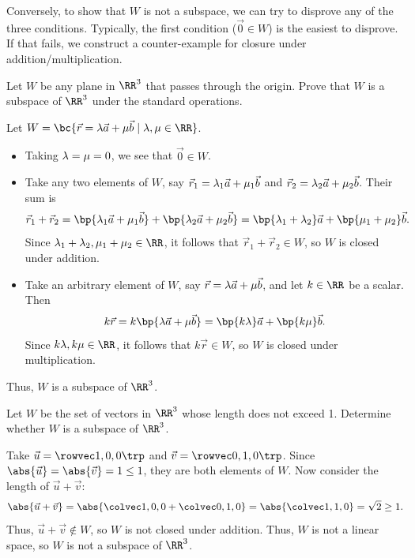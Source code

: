 Conversely, to show that $W$ is not a subspace, we can try to disprove any of the three conditions. Typically, the first condition ($\vec 0 \in W$) is the easiest to disprove. If that fails, we construct a counter-example for closure under addition/multiplication.

\begin{sample}\label{sample:linear-transformations:planes}
    Let $W$ be any plane in $\RR^3$ that passes through the origin. Prove that $W$ is a subspace of $\RR^3$ under the standard operations.
\end{sample}
\begin{sampans}
    Let $W = \bc{\vec r = \l \vec a + \m \vec b \mid \l, \m \in \RR}$.
    \begin{itemize}
        \item Taking $\lambda = \mu = 0$, we see that $\vec 0 \in W$.
        \item Take any two elements of $W$, say $\vec r_1 = \lambda_1 \vec a + \mu_1 \vec b$ and $\vec r_2 = \lambda_2 \vec a + \mu_2 \vec b$. Their sum is \[\vec r_1 + \vec r_2 = \bp{\l_1 \vec a + \m_1 \vec b} + \bp{\l_2 \vec a + \m_2 \vec b} = \bp{\l_1 + \l_2} \vec a + \bp{\m_1 + \m_2} \vec b.\] Since $\l_1 + \l_2, \m_1 + \m_2 \in \RR$, it follows that $\vec r_1 + \vec r_2 \in W$, so $W$ is closed under addition.
        \item Take an arbitrary element of $W$, say $\vec r = \lambda \vec a + \mu \vec b$, and let $k \in \RR$ be a scalar. Then \[k\vec r = k\bp{\l \vec a + \m \vec b} = \bp{k \l} \vec a + \bp{k \m} \vec b.\] Since $k\l, k\m \in \RR$, it follows that $k \vec r \in W$, so $W$ is closed under multiplication.
    \end{itemize}
    Thus, $W$ is a subspace of $\RR^3$.
\end{sampans}

\begin{sample}
    Let $W$ be the set of vectors in $\RR^3$ whose length does not exceed 1. Determine whether $W$ is a subspace of $\RR^3$.
\end{sample}
\begin{sampans}
    Take $\vec u = \cveciiix100$ and $\vec v = \cveciiix010$. Since $\abs{\vec u} = \abs{\vec v} = 1 \leq 1$, they are both elements of $W$. Now consider the length of $\vec u + \vec v$: \[\abs{\vec u + \vec v} = \abs{\cveciii100 + \cveciii010} = \abs{\cveciii110} = \sqrt{2} \geq 1.\] Thus, $\vec u + \vec v \notin W$, so $W$ is not closed under addition. Thus, $W$ is not a linear space, so $W$ is not a subspace of $\RR^3$.
\end{sampans}

